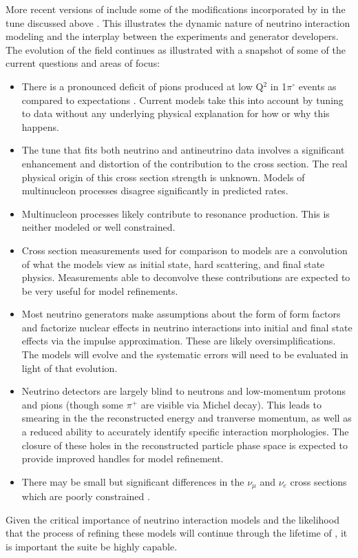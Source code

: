 More recent versions of  include some of the modifications incorporated by  in the tune discussed above \cite{Alam:2015nkk}.  This illustrates the dynamic nature of neutrino interaction modeling and the interplay between the experiments and generator developers.  The evolution of the field continues as illustrated with a snapshot of some of the current questions and areas of focus:
\begin{itemize}
    \item There is a pronounced deficit of pions produced at low Q$^{2}$ in 1$\pi^{\circ}$ events as compared to expectations \cite{BercellieNUINT2018,Altinok:2017xua,Aliaga:2015wva,McGivern:2016bwh,novaminosPC}.  Current models take this into account by tuning to data without any underlying physical explanation for how or why this happens.
    \item The  tune that fits both neutrino and antineutrino  data involves a significant enhancement and distortion of the  contribution to the cross section.  The real physical origin of this cross section strength is unknown.  Models of multinucleon processes disagree significantly in predicted rates.
    \item Multinucleon processes likely contribute to resonance production.  This is neither modeled or well constrained.
    \item Cross section measurements used for comparison to models are a convolution of what the models view as initial state, hard scattering, and final state physics.   Measurements able to deconvolve these contributions are expected to be very useful for model refinements.  
    \item Most neutrino generators make assumptions about the form of form factors and factorize nuclear effects in neutrino interactions into initial and final state effects via the impulse approximation.  These are likely oversimplifications.  The models will evolve and the systematic errors will need to be evaluated in light of that evolution. 
    \item  Neutrino detectors are largely blind to neutrons and low-momentum protons and pions (though some $\pi^{+}$ are visible via Michel decay).  This leads to smearing in the the reconstructed energy and tranverse momentum, as well as a reduced ability to accurately identify specific interaction morphologies.  The closure of these holes in the reconstructed particle phase space is expected to provide improved handles for model refinement.
    \item There may be small but significant differences in the $\nu_{\mu}$ and $\nu_{e}$  cross sections which are poorly constrained \cite{Day2012gb}.
\end{itemize}
Given the critical importance of neutrino interaction models and the likelihood that the process of refining these models will continue through the lifetime of , it is important the    suite be highly capable.   

